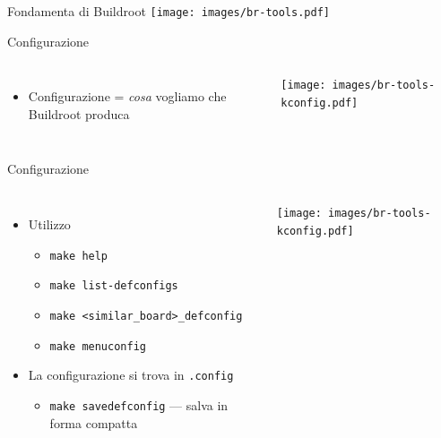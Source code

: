 \documentclass[xetex,table]{beamer}
\begin{document}
\begin{frame}{Fondamenta di Buildroot}
  \center\texttt{[image: images/br-tools.pdf]}
\end{frame}

\begin{frame}{Configurazione}
  \begin{columns}
    \begin{itemize}
    \item Configurazione = {\em cosa} vogliamo che Buildroot produca
    \end{itemize}
    \texttt{[image: images/br-tools-kconfig.pdf]}
  \end{columns}
\end {frame}

\begin{frame}{Configurazione}
  \begin{columns}
    \begin{itemize}
    \item Utilizzo
      \begin{itemize}
      \item {\tt make help}
      \item {\tt make list-defconfigs}
      \item {\tt make <similar\_board>\_defconfig}
      \item {\tt make menuconfig}      
      \end{itemize}
    \item La configurazione si trova in {\tt .config}
      \begin{itemize}
      \item {\tt make savedefconfig} --- salva in forma compatta
      \end{itemize}
    \end{itemize}
    \texttt{[image: images/br-tools-kconfig.pdf]}
  \end{columns}
\end {frame}
\end{document}
